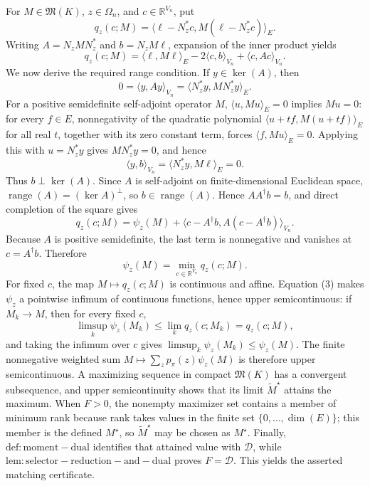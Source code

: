 For \(M\in\mathfrak M(K)\), \(z\in\Omega_n\), and \(c\in\mathbb R^{V_n}\), put
\[
 q_z(c;M)=
 \langle\ell-N_z^{\ast}c,M(\ell-N_z^{\ast}c)\rangle_E.
\]
Writing \(A=N_zMN_z^{\ast}\) and \(b=N_zM\ell\), expansion of the inner product yields
\[
 q_z(c;M)=\langle\ell,M\ell\rangle_E-2\langle c,b\rangle_{V_n}
 +\langle c,Ac\rangle_{V_n}.
\]
We now derive the required range condition.  If \(y\in\ker(A)\), then
\[
 0=\langle y,Ay\rangle_{V_n}
 =\langle N_z^{\ast}y,MN_z^{\ast}y\rangle_E.
\]
For a positive semidefinite self-adjoint operator \(M\), \(\langle u,Mu\rangle_E=0\) implies \(Mu=0\): for every \(f\in E\), nonnegativity of the quadratic polynomial \(\langle u+tf,M(u+tf)\rangle_E\) for all real \(t\), together with its zero constant term, forces \(\langle f,Mu\rangle_E=0\).  Applying this with \(u=N_z^{\ast}y\) gives \(MN_z^{\ast}y=0\), and hence
\[
 \langle y,b\rangle_{V_n}
 =\langle N_z^{\ast}y,M\ell\rangle_E=0.
\]
Thus \(b\perp\ker(A)\).  Since \(A\) is self-adjoint on finite-dimensional Euclidean space, \(\operatorname{range}(A)=(\ker A)^{\perp}\), so \(b\in\operatorname{range}(A)\).  Hence \(AA^{\dagger}b=b\), and direct completion of the square gives
\[
 q_z(c;M)=\psi_z(M)
 +\langle c-A^{\dagger}b,A(c-A^{\dagger}b)\rangle_{V_n}.
\]
Because \(A\) is positive semidefinite, the last term is nonnegative and vanishes at \(c=A^{\dagger}b\).  Therefore
\[
 \psi_z(M)=\min_{c\in\mathbb R^{V_n}}q_z(c;M). \tag{3}
\]
For fixed \(c\), the map \(M\mapsto q_z(c;M)\) is continuous and affine.  Equation (3) makes \(\psi_z\) a pointwise infimum of continuous functions, hence upper semicontinuous: if \(M_k\to M\), then for every fixed \(c\),
\[
 \limsup_k\psi_z(M_k)
 \le\lim_k q_z(c;M_k)=q_z(c;M),
\]
and taking the infimum over \(c\) gives \(\limsup_k\psi_z(M_k)\le\psi_z(M)\).  The finite nonnegative weighted sum \(M\mapsto\sum_zp_{\pi}(z)\psi_z(M)\) is therefore upper semicontinuous.  A maximizing sequence in compact \(\mathfrak M(K)\) has a convergent subsequence, and upper semicontinuity shows that its limit \(\widetilde M^{\star}\) attains the maximum.  When \(F>0\), the nonempty maximizer set contains a member of minimum rank because rank takes values in the finite set \(\{0,\ldots,\dim(E)\}\); this member is the defined \(M^{\star}\), so \(\widetilde M^{\star}\) may be chosen as \(M^{\star}\).  Finally, \(\mathrm{def:moment-dual}\) identifies that attained value with \(\mathcal D\), while \(\mathrm{lem:selector-reduction-and-dual}\) proves \(F=\mathcal D\).  This yields the asserted matching certificate.